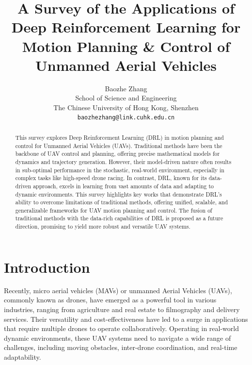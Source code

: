 \documentclass{article}
\title{A Survey of the Applications of Deep Reinforcement 
Learning for Motion Planning \& Control of Unmanned Aerial Vehicles}
\author{%
  Baozhe Zhang \\
  School of Science and Engineering\\
  The Chinese University of Hong Kong, Shenzhen\\
  \texttt{baozhezhang@link.cuhk.edu.cn} \\
}
\begin{document}
\maketitle


\begin{abstract}
  This survey explores Deep Reinforcement Learning (DRL) in motion planning and control for Unmanned Aerial Vehicles (UAVs). Traditional methods have been the backbone of UAV control and planning, offering precise mathematical models for dynamics and trajectory generation. However, their model-driven nature often results in sub-optimal performance in the stochastic, real-world environment, especially in complex tasks like high-speed drone racing.
  In contrast, DRL, known for its data-driven approach, excels in learning from vast amounts of data and adapting to dynamic environments. This survey highlights key works that demonstrate DRL's ability to overcome limitations of traditional methods, offering unified, scalable, and generalizable frameworks for UAV motion planning and control. 
  The fusion of traditional methods with the data-rich capabilities of DRL is proposed as a future direction, promising to yield more robust and versatile UAV systems.
\end{abstract}


\section{Introduction}
Recently, micro aerial vehicles (MAVs) or 
unmanned Aerial Vehicles (UAVs), commonly known as drones, 
have emerged as a powerful tool in various industries, 
ranging from agriculture and real estate to filmography and delivery 
services. 
Their versatility and cost-effectiveness have led to a 
surge in applications that require multiple drones to operate 
collaboratively. 
Operating in real-world dynamic environments, 
these UAV systems need to navigate a wide range of 
challenges, 
including moving obstacles, inter-drone coordination, and 
real-time adaptability. 
\end{document}
